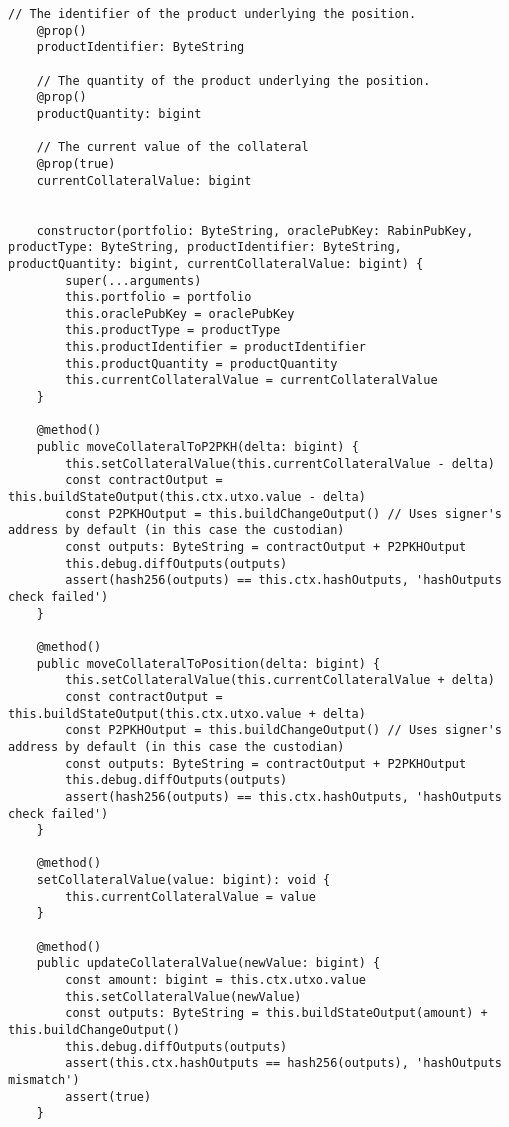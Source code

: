 \begin{lstlisting}[style=htmlcssjs, caption=Position Smart Contract]
    // The identifier of the product underlying the position.
    @prop()
    productIdentifier: ByteString

    // The quantity of the product underlying the position.
    @prop()
    productQuantity: bigint

    // The current value of the collateral
    @prop(true)
    currentCollateralValue: bigint
    

    constructor(portfolio: ByteString, oraclePubKey: RabinPubKey, productType: ByteString, productIdentifier: ByteString, productQuantity: bigint, currentCollateralValue: bigint) {
        super(...arguments)
        this.portfolio = portfolio
        this.oraclePubKey = oraclePubKey
        this.productType = productType
        this.productIdentifier = productIdentifier
        this.productQuantity = productQuantity
        this.currentCollateralValue = currentCollateralValue
    }

    @method()
    public moveCollateralToP2PKH(delta: bigint) {
        this.setCollateralValue(this.currentCollateralValue - delta)
        const contractOutput = this.buildStateOutput(this.ctx.utxo.value - delta)
        const P2PKHOutput = this.buildChangeOutput() // Uses signer's address by default (in this case the custodian)
        const outputs: ByteString = contractOutput + P2PKHOutput
        this.debug.diffOutputs(outputs)
        assert(hash256(outputs) == this.ctx.hashOutputs, 'hashOutputs check failed')
    }

    @method()
    public moveCollateralToPosition(delta: bigint) {
        this.setCollateralValue(this.currentCollateralValue + delta)
        const contractOutput = this.buildStateOutput(this.ctx.utxo.value + delta)
        const P2PKHOutput = this.buildChangeOutput() // Uses signer's address by default (in this case the custodian)
        const outputs: ByteString = contractOutput + P2PKHOutput
        this.debug.diffOutputs(outputs)
        assert(hash256(outputs) == this.ctx.hashOutputs, 'hashOutputs check failed')
    }

    @method()
    setCollateralValue(value: bigint): void {
        this.currentCollateralValue = value
    }

    @method()
    public updateCollateralValue(newValue: bigint) {
        const amount: bigint = this.ctx.utxo.value
        this.setCollateralValue(newValue)
        const outputs: ByteString = this.buildStateOutput(amount) + this.buildChangeOutput()
        this.debug.diffOutputs(outputs)
        assert(this.ctx.hashOutputs == hash256(outputs), 'hashOutputs mismatch')
        assert(true)
    }


\end{lstlisting}
